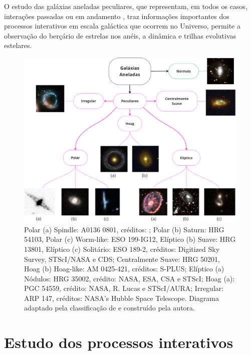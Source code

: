 O estudo das galáxias aneladas peculiares, que representam, em todos os casos, interações passadas ou em andamento \cite{1983AJ}, traz informações importantes dos processos interativos em escala galáctica que ocorrem no Universo, permite a observação do berçário de estrelas nos anéis, a dinâmica e trilhas evolutivas estelares.

\begin{figure}
  \centering 
  \includegraphics[width=1.0\textwidth]{Imagens/quadro.png} 
  \caption[Família dos anéis]{Polar (a) Spindle: A0136 0801, créditos: \cite{1995AIPC}; Polar (b) Saturn: HRG 54103, Polar (c) Worm-like: ESO 199-IG12, Elíptico (b) Suave: HRG 13801, Elíptico (c) Solitário: ESO 189-2, créditos: Digitized Sky Survey, STScI/NASA e CDS; Centralmente Suave: HRG 50201, Hoag (b) Hoag-like: AM 0425-421, créditos: S-PLUS; Elíptico (a) Nódulos: HRG 35002, crédito: NASA, ESA, CSA e STScI; Hoag (a): PGC 54559, crédito: NASA, R. Lucas e STScI/AURA; Irregular: ARP 147, créditos: NASA's Hubble Space Telescope. Diagrama adaptado pela classificação de  e construído pela autora.}
  \label{fig:quadro} 
\end{figure}


\section{Estudo dos processos interativos}

